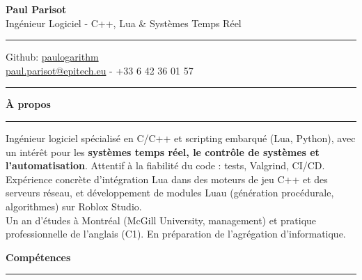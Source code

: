\documentclass[9pt]{extarticle}
\begin{document}
\begin{center}
	{\huge\bfseries Paul Parisot}
	\\[4pt]
	{\Large Ingénieur Logiciel - C++, Lua \& Systèmes Temps Réel}
	\\
\end{center}

\par\vspace{-5pt}
\rule{\linewidth}{0.4pt}
\par\vspace{-5pt}

\begin{center}
	Github: \href{https://github.com/paulogarithm}{paulogarithm}
	\\
	\href{mailto:paul.parisot@epitech.eu}{paul.parisot@epitech.eu} - +33 6 42 36 01 57
	\\
\end{center}

\par\vspace{-10pt}
\rule{\linewidth}{0.4pt}
\par\vspace{7pt}

{\large\bfseries À propos}
\par\vspace{-8pt}
\rule{\linewidth}{0.4pt}
\par\vspace{5pt}

Ingénieur logiciel spécialisé en C/C++ et scripting embarqué (Lua, Python), avec un intérêt pour les {\bfseries systèmes temps réel, le contrôle de systèmes et l'automatisation}. Attentif à la fiabilité du code : tests, Valgrind, CI/CD.
\\
Expérience concrète d'intégration Lua dans des moteurs de jeu C++ et des serveurs réseau, et développement de modules Luau (génération procédurale, algorithmes) sur Roblox Studio.
\\
Un an d'études à Montréal (McGill University, management) et pratique professionnelle de l'anglais (C1). En préparation de l'agrégation d'informatique.
\par\vspace{5pt}

{\large\bfseries Compétences}
\par\vspace{-8pt}
\rule{\linewidth}{0.4pt}
\par\vspace{5pt}
\end{document}
